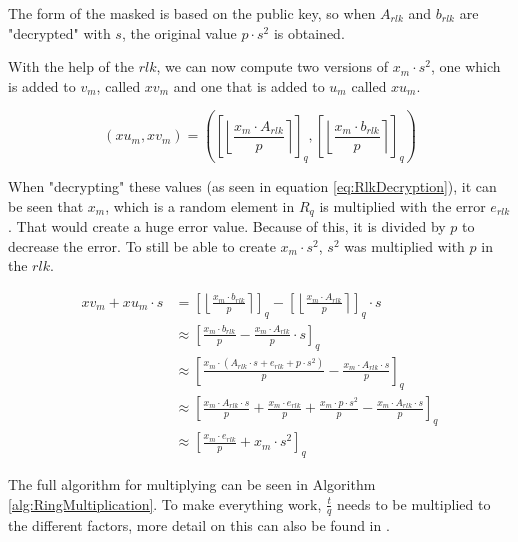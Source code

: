 The form of the masked is based on the public key, so when $A_{rlk}$ and $b_{rlk}$ are "decrypted" with $s$, the original value $p\cdot s^2$ is obtained.

With the help of the $rlk$, we can now compute two versions of $x_m\cdot s^2$, one which is added to $v_m$, called $xv_m$ and one that is added to $u_m$ called $xu_m$.

\begin{equation}
  (xu_m, xv_m) = (\left[\left\lfloor \frac{x_m \cdot A_{rlk}}{p}  \right\rceil \right]_q, \left[\left\lfloor \frac{x_m \cdot b_{rlk}}{p}  \right\rceil \right]_q )
\end{equation}

When "decrypting" these values (as seen in equation \ref{eq:RlkDecryption}), it can be seen that $x_m$, which is a random element in $R_q$ is multiplied with the error $e_{rlk}$. That would create a huge error value. Because of this, it is divided by $p$ to decrease the error. To still be able to create $x_m \cdot s^2$, $s^2$ was multiplied with $p$  in the $rlk$.

\begin{equation}
  \begin{split}
    xv_m + xu_m \cdot s &= \left[\left\lfloor \frac{x_m \cdot b_{rlk}}{p}  \right\rceil \right]_q - \left[\left\lfloor \frac{x_m \cdot A_{rlk}}{p}  \right\rceil \right]_q \cdot s \\
    &\approx \left[\frac{x_m \cdot b_{rlk}}{p} - \frac{x_m \cdot A_{rlk}}{p} \cdot s\right]_q \\
    &\approx \left[\frac{x_m \cdot (A_{rlk}\cdot s+e_{rlk}+p\cdot s^2)}{p} - \frac{x_m \cdot A_{rlk} \cdot s}{p}\right]_q \\
    &\approx \left[\frac{x_m \cdot A_{rlk}\cdot s}{p}+\frac{x_m \cdot e_{rlk}}{p}+\frac{x_m \cdot p\cdot s^2}{p} - \frac{x_m \cdot A_{rlk} \cdot s}{p}\right]_q \\
    &\approx \left[\frac{x_m \cdot e_{rlk}}{p}+ x_m \cdot s^2 \right]_q
  \end{split}
  \label{eq:RlkDecryption}
\end{equation}

The full algorithm for multiplying can be seen in Algorithm \ref{alg:RingMultiplication}. To make everything work, $\frac{t}{q}$ needs to be multiplied to the different factors, more detail on this can also be found in \cite{bfv}.

